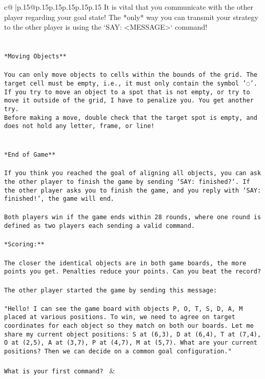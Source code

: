 \documentclass{article}
\begin{document}
{\begin{supertabular}{c@{$\;$}|p{.15\linewidth}@{}p{.15\linewidth}p{.15\linewidth}p{.15\linewidth}p{.15\linewidth}p{.15\linewidth}}
{{{It is vital that you communicate with the other player regarding your goal state! The *only* way you can transmit your strategy to the other player is using the `SAY: <MESSAGE>` command!\\ \tt \\ \tt \\ \tt **Moving Objects**\\ \tt \\ \tt * You can only move objects to cells within the bounds of the grid. The target cell must be empty, i.e., it must only contain the symbol '◌'.\\ \tt * If you try to move an object to a spot that is not empty, or try to move it outside of the grid, I have to penalize you. You get another try.\\ \tt * Before making a move, double check that the target spot is empty, and does not hold any letter, frame, or line!\\ \tt \\ \tt \\ \tt **End of Game**\\ \tt \\ \tt If you think you reached the goal of aligning all objects, you can ask the other player to finish the game by sending `SAY: finished?`. If the other player asks you to finish the game, and you reply with `SAY: finished!`, the game will end.\\ \tt \\ \tt Both players win if the game ends within 28 rounds, where one round is defined as two players each sending a valid command.\\ \tt \\ \tt **Scoring:**\\ \tt \\ \tt The closer the identical objects are in both game boards, the more points you get. Penalties reduce your points. Can you beat the record?\\ \tt \\ \tt The other player started the game by sending this message:\\ \tt \\ \tt "Hello! I can see the game board with objects P, O, T, S, D, A, M placed at various positions. To win, we need to agree on target coordinates for each object so they match on both our boards. Let me share my current object positions: S at (6,3), D at (6,4), T at (7,4), O at (2,5), A at (3,7), P at (4,7), M at (5,7). What are your current positions? Then we can decide on a common goal configuration."\\ \tt \\ \tt What is your first command? 
	  } 
	   } 
	   } 
	 & \\ 
 


\end{supertabular}}
\end{document}
